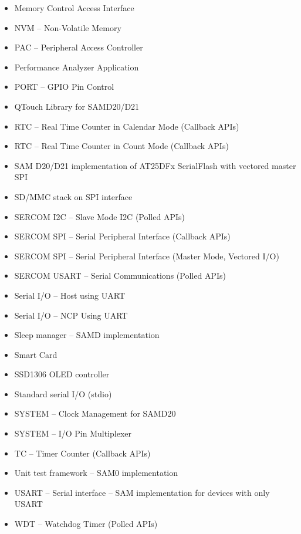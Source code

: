 \begin{multicols}{2}
\begin{flushleft}
\begin{itemize}
			\item Memory Control Access Interface
			\item NVM -- Non-Volatile Memory
			\item PAC -- Peripheral Access Controller
			\item Performance Analyzer Application
			\item PORT -- GPIO Pin Control
			\item QTouch Library for SAMD20/D21
			\item RTC -- Real Time Counter in Calendar Mode (Callback \ac{API}s)
			\item RTC -- Real Time Counter in Count Mode (Callback \ac{API}s)
			\item SAM D20/D21 implementation of AT25DFx SerialFlash with vectored master SPI
			\item SD/MMC stack on SPI interface
			\item SERCOM I2C -- Slave Mode I2C (Polled \ac{API}s)
			\item SERCOM SPI -- Serial Peripheral Interface (Callback \ac{API}s)
			\item SERCOM SPI -- Serial Peripheral Interface (Master Mode, Vectored I/O)
			\item SERCOM USART -- Serial Communications (Polled \ac{API}s)
			\item Serial I/O -- Host using UART
			\item Serial I/O -- NCP Using UART
			\item Sleep manager -- SAMD implementation
			\item Smart Card
			\item SSD1306 OLED controller
			\item Standard serial I/O (stdio)
			\item SYSTEM -- Clock Management for SAMD20
			\item SYSTEM -- I/O Pin Multiplexer
			\item TC -- Timer Counter (Callback \ac{API}s)
			\item Unit test framework -- SAM0 implementation
			\item USART -- Serial interface -- SAM implementation for devices with only USART
			\item WDT -- Watchdog Timer (Polled \ac{API}s)
		\end{itemize}
	\end{flushleft}
\end{multicols}

\newpage
